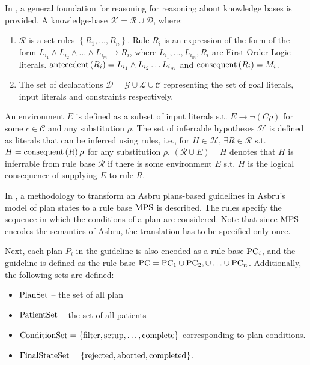 In \cite{PreeceJIS94}, a general foundation for reasoning for reasoning
about knowledge bases is provided. A knowledge-base $\mathcal{K} = \mathcal{R}
\cup \mathcal{D}$, where:
\begin{enumerate}
  \item $\mathcal{R}$ is a set rules $\left\{R_1, \dots, R_n\right\}$.
    Rule $R_i$ is an expression of the form of the form
    $L_{i_1} \wedge L_{i_2} \wedge \dots \wedge L_{i_m} \rightarrow R_i$,
    where $L_{i_1}, \dots, L_{i_m}, R_i$ are First-Order Logic literals.
    $\text{antecedent}\left(R_i\right) = L_{i_1} \wedge L_{i_2} \dots L_{i_m}$ and $\text{consequent}\left(R_i\right) = M_i$.
  \item The set of declarations $\mathcal{D} = \mathcal{G} \cup \mathcal{L} \cup
    \mathcal{C}$ representing the set of goal literals, input literals and
    constraints respectively.
\end{enumerate}
An environment $E$ is defined as a subset of input literals s.t. $E \to
\neg(C\rho)$ for some $c \in \mathcal{C}$ and any substitution $\rho$.
The set of inferrable hypotheses $\mathcal{H}$ is defined as literals
that can be inferred using rules, i.e., for $H \in \mathcal{H}$,
$\exists R \in \mathcal{R}$ s.t. $H = \text{consequent}\left(R\right)\rho$ for any
substitution $\rho$. $\left(\mathcal{R} \cup E \right) \vdash H$
denotes that $H$ is inferrable from rule base $\mathcal{R}$ if there
is some environment $E$ s.t. $H$ is the logical consequence of supplying
$E$ to rule $R$.

In \cite{DuftschmidAIM01}, a methodology to transform
an Asbru plans-based guidelines in
Asbru's model of plan states to a rule base $\text{MPS}{}$ is described.
The rules specify the sequence in which the conditions of a plan
are considered. Note that since $\text{MPS}$ encodes the semantics of Asbru,
the translation has to be specified only once.

Next, each plan $P_i$ in the guideline is also encoded as a rule base
$\text{PC}_i$, and the guideline is defined as the rule base $\text{PC} = \text{PC}_1 \cup \text{PC}_2,
\cup \dots \cup \text{PC}_n$. Additionally, the following sets are defined:
\begin{itemize}
  \item $\text{PlanSet}$ -- the set of all plan
  \item $\text{PatientSet}$ -- the set of all patients
  \item $\text{ConditionSet} = \left\{\text{filter}, \text{setup}, \dots,
    \text{complete}\right\}$ corresponding to plan conditions.
  \item $\text{FinalStateSet} = \left\{\text{rejected}, \text{aborted}, \text{completed}\right\}$.
\end{itemize}

